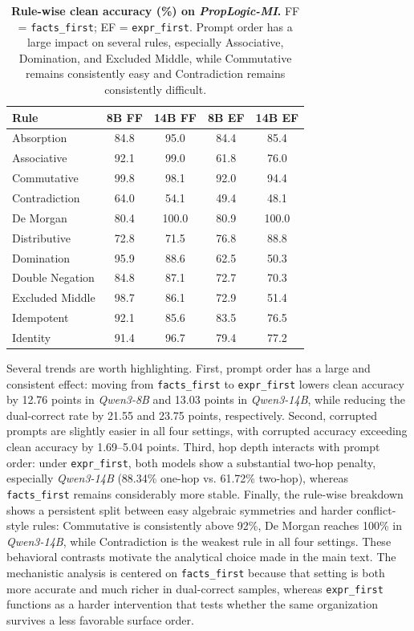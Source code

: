 \documentclass[11pt]{article}
\begin{document}
\begin{table}[t]
\centering
\small
\renewcommand{\arraystretch}{0.95}
\setlength{\tabcolsep}{5pt}
\begin{tabularx}{\columnwidth}{@{} X c c c c @{} }
\toprule
\textbf{Rule} & \textbf{8B FF} & \textbf{14B FF} & \textbf{8B EF} & \textbf{14B EF} \\
\midrule
Absorption & 84.8 & 95.0 & 84.4 & 85.4 \\
Associative & 92.1 & 99.0 & 61.8 & 76.0 \\
Commutative & 99.8 & 98.1 & 92.0 & 94.4 \\
Contradiction & 64.0 & 54.1 & 49.4 & 48.1 \\
De Morgan & 80.4 & 100.0 & 80.9 & 100.0 \\
Distributive & 72.8 & 71.5 & 76.8 & 88.8 \\
Domination & 95.9 & 88.6 & 62.5 & 50.3 \\
Double Negation & 84.8 & 87.1 & 72.7 & 70.3 \\
Excluded Middle & 98.7 & 86.1 & 72.9 & 51.4 \\
Idempotent & 92.1 & 85.6 & 83.5 & 76.5 \\
Identity & 91.4 & 96.7 & 79.4 & 77.2 \\
\bottomrule
\end{tabularx}
\caption{\textbf{Rule-wise clean accuracy (\%) on \textit{PropLogic-MI}.} FF = \texttt{facts\_first}; EF = \texttt{expr\_first}. Prompt order has a large impact on several rules, especially Associative, Domination, and Excluded Middle, while Commutative remains consistently easy and Contradiction remains consistently difficult.}
\label{tab:appendix_rule_performance}
\end{table}

Several trends are worth highlighting. First, prompt order has a large and consistent effect: moving from \texttt{facts\_first} to \texttt{expr\_first} lowers clean accuracy by 12.76 points in \textit{Qwen3-8B} and 13.03 points in \textit{Qwen3-14B}, while reducing the dual-correct rate by 21.55 and 23.75 points, respectively. Second, corrupted prompts are slightly easier in all four settings, with corrupted accuracy exceeding clean accuracy by 1.69--5.04 points. Third, hop depth interacts with prompt order: under \texttt{expr\_first}, both models show a substantial two-hop penalty, especially \textit{Qwen3-14B} (88.34\% one-hop vs. 61.72\% two-hop), whereas \texttt{facts\_first} remains considerably more stable. Finally, the rule-wise breakdown shows a persistent split between easy algebraic symmetries and harder conflict-style rules: Commutative is consistently above 92\%, De Morgan reaches 100\% in \textit{Qwen3-14B}, while Contradiction is the weakest rule in all four settings.
These behavioral contrasts motivate the analytical choice made in the main text. The mechanistic analysis is centered on \texttt{facts\_first} because that setting is both more accurate and much richer in dual-correct samples, whereas \texttt{expr\_first} functions as a harder intervention that tests whether the same organization survives a less favorable surface order.
\end{document}
